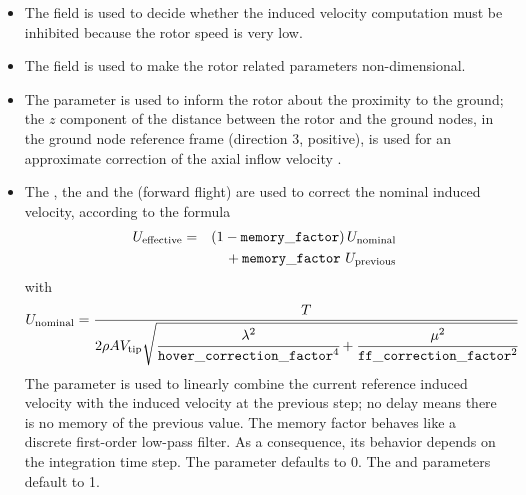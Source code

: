 \begin{itemize}
\item
The  field is used to decide whether
the induced velocity computation must be inhibited because the rotor speed
is very low.

\item
The  field is used to make the rotor related parameters
non-dimensional.

\item
The  parameter is used to inform the rotor about the proximity
to the ground; the $z$ component of the distance between the rotor
and the ground nodes, in the ground node reference frame
(direction 3, positive),
is used for an approximate correction of the axial inflow velocity
\cite{NASA-TR-3021}.

\item
The , the  
and the  (forward flight) are
used to correct the nominal induced velocity, according to the formula
\begin{eqnarray*}
	U_{\text{effective}} & = &
	\left( 1 - \mathtt{memory\_factor} \right) 
		U_{\text{nominal}} \\
	& & \mbox{} + \mathtt{memory\_factor} \ U_{\text{previous}}
\end{eqnarray*}
with
\begin{displaymath}
	U_{\text{nominal}} = \frac{T}{2 \rho A V_{\text{tip}} \sqrt{
		\cfrac{\lambda^2}{\mathtt{hover\_correction\_factor}^4}
		+ \cfrac{\mu^2}{\mathtt{ff\_correction\_factor}^2}
	}}
\end{displaymath}
The  parameter is used to linearly combine the current
reference induced velocity with the induced velocity at the previous step;
no delay means there is no memory of the previous value.
The memory factor behaves like a discrete first-order low-pass filter.
As a consequence, its behavior depends on the integration time step.
The  parameter defaults to 0.
The  
and  parameters default to 1.


\end{itemize}
